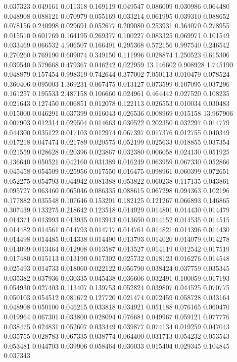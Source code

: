 0.037323
0.049161
0.011318
0.169119
0.049547
0.086009
0.030986
0.064480
0.048908
0.088121
0.070979
0.055169
0.033214
0.061995
0.039310
0.088652
0.078156
0.240998
0.029691
0.052677
0.209080
0.253931
0.364070
0.278955
0.015510
0.601769
0.164195
0.269377
0.100227
0.083325
0.069971
0.101549
0.033469
0.066532
4.906507
0.166491
0.295368
0.572156
0.997540
0.246542
0.270260
0.769190
0.609074
0.349150
0.111996
0.028874
1.250523
0.615306
0.039540
0.579668
0.479367
0.046242
0.022959
13.146602
0.908928
1.745190
0.048879
0.157454
0.998319
0.742644
0.377002
7.050113
0.010479
0.078524
0.360406
0.095003
1.369231
0.067475
0.013127
0.073599
0.107095
0.037296
0.161257
0.195533
2.487158
0.106660
0.024961
0.464442
0.027520
0.108235
0.021643
0.127450
0.006851
0.012078
0.122113
0.026553
0.010034
0.030483
0.015000
0.046291
0.037399
0.016043
0.026536
0.008969
0.015158
13.967906
0.007903
0.012314
0.029504
0.014663
0.030522
0.202350
0.032297
0.014779
0.044300
0.035122
0.017103
0.012974
0.067397
0.017376
0.012755
0.040349
0.017218
0.047474
0.021789
0.020575
0.052199
0.025633
0.018855
0.037354
0.021559
0.028628
0.020396
0.023867
0.032380
0.006058
0.024130
0.051925
0.136640
0.050521
0.042160
0.031389
0.016249
0.063959
0.067330
0.052866
0.045458
0.054509
0.025956
0.017550
0.016475
0.098961
0.060399
0.072651
0.052275
0.054793
0.044942
0.081388
0.053822
0.060238
0.117135
0.043861
0.095727
0.063460
0.065046
0.086335
0.088615
0.067298
0.094363
0.102196
0.177882
0.035548
0.107646
0.153201
0.182125
0.121267
0.066893
0.146865
0.307439
0.133275
0.218642
0.123518
0.014929
0.014801
0.014430
0.014479
0.014371
0.013993
0.013935
0.013913
0.013650
0.014152
0.014535
0.014515
0.014482
0.014561
0.014793
0.014717
0.014761
0.014821
0.014396
0.014430
0.014498
0.014485
0.014338
0.014490
0.013793
0.014020
0.014079
0.014278
0.014099
0.013464
0.012908
0.013587
0.013527
0.014119
0.012542
0.017519
0.017480
0.015113
0.013190
0.017302
0.025732
0.018123
0.016276
0.014548
0.025493
0.014733
0.018060
0.022122
0.056790
0.038424
0.037759
0.035345
0.035382
0.037936
0.030335
0.045438
0.036606
0.032491
0.100059
0.017193
0.054930
0.027403
0.113407
0.139753
0.052824
0.039807
0.044525
0.070775
0.050103
0.054512
0.081672
0.127720
0.021474
0.072459
0.058728
0.033164
0.048908
0.050100
0.046215
0.033818
0.034921
0.051188
0.076165
0.060470
0.019964
0.067301
0.033800
0.028094
0.076681
0.049967
0.059121
0.077776
0.038475
0.024831
0.052607
0.033449
0.039877
0.074134
0.019259
0.047043
0.035755
0.028783
0.067335
0.038774
0.064400
0.031713
0.054232
0.053543
0.053481
0.044703
0.039906
0.058464
0.036033
0.015404
0.029345
0.104845
0.037343
